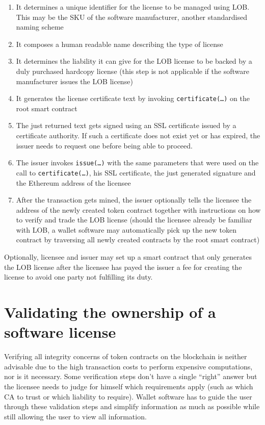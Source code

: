 \documentclass[a4paper]{article}
\begin{document}
\begin{enumerate}
  \item It determines a unique identifier for the license to be managed using LOB. This may be the SKU of the software manufacturer, another standardised naming scheme
  \item It composes a human readable name describing the type of license
  \item It determines the liability it can give for the LOB license to be backed by a duly purchased hardcopy license (this step is not applicable if the software manufacturer issues the LOB license)
  \item It generates the license certificate text by invoking \texttt{certificate(…)} on the root smart contract
  \item The just returned text gets signed using an SSL certificate issued by a certificate authority. If such a certificate does not exist yet or has expired, the issuer needs to request one before being able to proceed.
  \item The issuer invokes \texttt{issue(…)} with the same parameters that were used on the call to \texttt{certificate(…)}, his SSL certificate, the just generated signature and the Ethereum address of the licensee
  \item After the transaction gets mined, the issuer optionally tells the licensee the address of the newly created token contract together with instructions on how to verify and trade the LOB license (should the licensee already be familiar with LOB, a wallet software may automatically pick up the new token contract by traversing all newly created contracts by the root smart contract)
\end{enumerate}

Optionally, licensee and issuer may set up a smart contract that only generates the LOB license after the licensee has payed the issuer a fee for creating the license to avoid one party not fulfilling its duty.

\section{Validating the ownership of a software license}
\label{ch:licenseValidation}

Verifying all integrity concerns of token contracts on the blockchain is neither advisable due to the high transaction costs to perform expensive computations, nor is it necessary. Some verification steps don't have a single “right” answer but the licensee needs to judge for himself which requirements apply (such as which CA to trust or which liability to require). Wallet software has to guide the user through these validation steps and simplify information as much as possible while still allowing the user to view all information.
\end{document}
